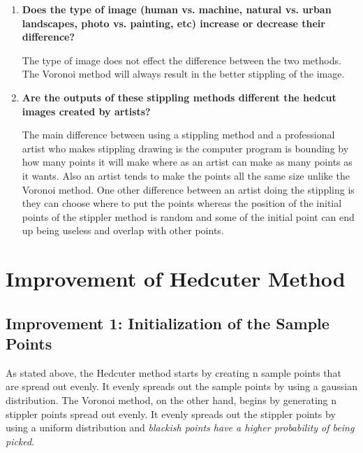 \documentclass[11pt]{article}
\begin{document}
\begin{enumerate}
\begin{adjustwidth}{24pt}{}
When stippling the fairyeyes image, the difference between the two methods is very noticeable. Figure 7 and 8 proves that the higher the contrast in the image the more transparent the difference is between the two methods.
\end{adjustwidth}


\item \textbf{Does the type of image (human vs. machine,  natural vs. urban landscapes, photo vs. painting, etc) increase or decrease their difference?} 

\begin{adjustwidth}{24pt}{}
The type of image does not effect the difference between the two methods. The Voronoi method will always result in the better stippling of the image.
\end{adjustwidth}

\item \textbf{Are the outputs of these stippling methods different  the hedcut images created by artists?} 

\begin{adjustwidth}{24pt}{}
The main difference between using a stippling method and a professional artist who makes stippling drawing is the computer program is bounding by how many points it will make where as an artist can make as many points as it wants. Also an artist tends to make the points all the same size unlike the Voronoi method. One other difference between an artist doing the stippling is they can choose where to put the points whereas the position of the initial points of the stippler method is random and some of the initial point can end up being useless and overlap with other points. 
\end{adjustwidth}

\end{enumerate}

\newpage

\section{Improvement of Hedcuter Method}

\subsection{Improvement 1: Initialization of the Sample Points}
 
 As stated above, the Hedcuter method starts by creating n sample points that are spread out evenly. It evenly spreads out the sample points by using a gaussian distribution. The Voronoi method, on the other hand, begins by generating n stippler points spread out evenly. It evenly spreads out the stippler points by using a uniform distribution and  \textit{blackish points have a higher probability of being picked}.
 
\end{document}
